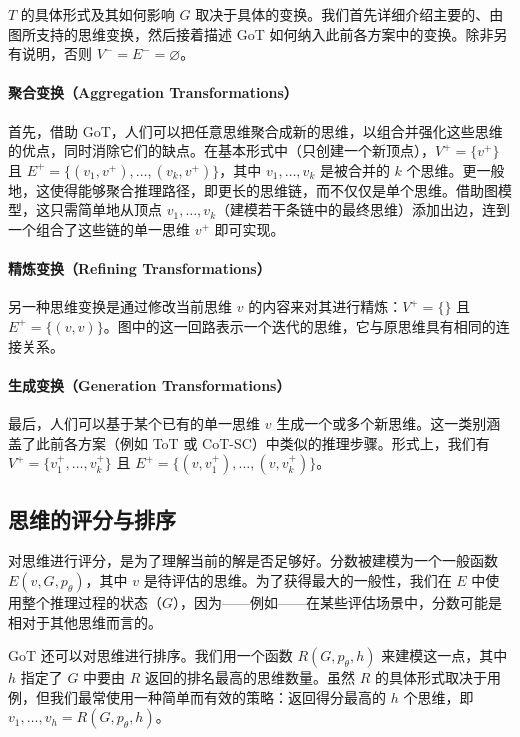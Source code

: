 \documentclass[11pt,UTF8,fontset=fandol]{ctexart}
\begin{document}
$T$ 的具体形式及其如何影响 $G$ 取决于具体的变换。我们首先详细介绍主要的、由图所支持的思维变换，然后接着描述 GoT 如何纳入此前各方案中的变换。除非另有说明，否则 $V^- = E^- = \varnothing$。

\paragraph{聚合变换（Aggregation Transformations）} 首先，借助 GoT，人们可以把任意思维聚合成新的思维，以组合并强化这些思维的优点，同时消除它们的缺点。在基本形式中（只创建一个新顶点），$V^+ = \{v^+\}$ 且 $E^+ = \{(v_1, v^+), \ldots, (v_k, v^+)\}$，其中 $v_1, \ldots, v_k$ 是被合并的 $k$ 个思维。更一般地，这使得能够聚合推理路径，即更长的思维链，而不仅仅是单个思维。借助图模型，这只需简单地从顶点 $v_1, \ldots, v_k$（建模若干条链中的最终思维）添加出边，连到一个组合了这些链的单一思维 $v^+$ 即可实现。

\paragraph{精炼变换（Refining Transformations）} 另一种思维变换是通过修改当前思维 $v$ 的内容来对其进行精炼：$V^+ = \{\}$ 且 $E^+ = \{(v, v)\}$。图中的这一回路表示一个迭代的思维，它与原思维具有相同的连接关系。

\paragraph{生成变换（Generation Transformations）} 最后，人们可以基于某个已有的单一思维 $v$ 生成一个或多个新思维。这一类别涵盖了此前各方案（例如 ToT 或 CoT-SC）中类似的推理步骤。形式上，我们有 $V^+ = \{v_1^+, \ldots, v_k^+\}$ 且 $E^+ = \{(v, v_1^+), \ldots, (v, v_k^+)\}$。

\subsection{思维的评分与排序}

对思维进行评分，是为了理解当前的解是否足够好。分数被建模为一个一般函数 $E(v, G, p_\theta)$，其中 $v$ 是待评估的思维。为了获得最大的一般性，我们在 $E$ 中使用整个推理过程的状态（$G$），因为——例如——在某些评估场景中，分数可能是相对于其他思维而言的。

GoT 还可以对思维进行排序。我们用一个函数 $R(G, p_\theta, h)$ 来建模这一点，其中 $h$ 指定了 $G$ 中要由 $R$ 返回的排名最高的思维数量。虽然 $R$ 的具体形式取决于用例，但我们最常使用一种简单而有效的策略：返回得分最高的 $h$ 个思维，即 $v_1, \ldots, v_h = R(G, p_\theta, h)$。
\end{document}

